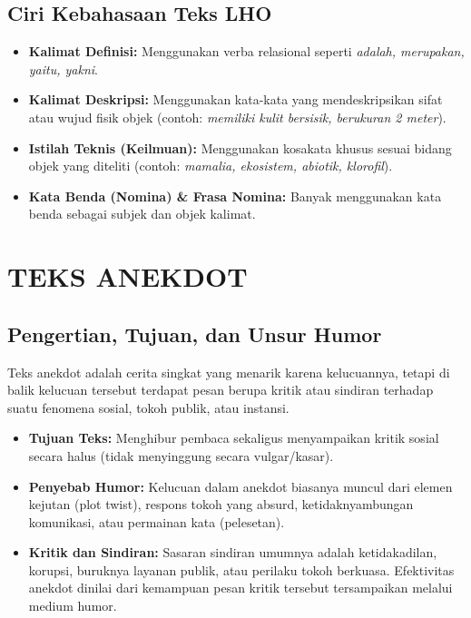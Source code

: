 \documentclass[12pt, a4paper]{article}
\begin{document}
\subsection{Ciri Kebahasaan Teks LHO}
\begin{itemize}
    \item \textbf{Kalimat Definisi:} Menggunakan verba relasional seperti \textit{adalah, merupakan, yaitu, yakni}.
    \item \textbf{Kalimat Deskripsi:} Menggunakan kata-kata yang mendeskripsikan sifat atau wujud fisik objek (contoh: \textit{memiliki kulit bersisik, berukuran 2 meter}).
    \item \textbf{Istilah Teknis (Keilmuan):} Menggunakan kosakata khusus sesuai bidang objek yang diteliti (contoh: \textit{mamalia, ekosistem, abiotik, klorofil}).
    \item \textbf{Kata Benda (Nomina) \& Frasa Nomina:} Banyak menggunakan kata benda sebagai subjek dan objek kalimat.
\end{itemize}

\section{TEKS ANEKDOT}

\subsection{Pengertian, Tujuan, dan Unsur Humor}
Teks anekdot adalah cerita singkat yang menarik karena kelucuannya, tetapi di balik kelucuan tersebut terdapat pesan berupa kritik atau sindiran terhadap suatu fenomena sosial, tokoh publik, atau instansi.
\begin{itemize}
    \item \textbf{Tujuan Teks:} Menghibur pembaca sekaligus menyampaikan kritik sosial secara halus (tidak menyinggung secara vulgar/kasar).
    \item \textbf{Penyebab Humor:} Kelucuan dalam anekdot biasanya muncul dari elemen kejutan (plot twist), respons tokoh yang absurd, ketidaknyambungan komunikasi, atau permainan kata (pelesetan).
    \item \textbf{Kritik dan Sindiran:} Sasaran sindiran umumnya adalah ketidakadilan, korupsi, buruknya layanan publik, atau perilaku tokoh berkuasa. Efektivitas anekdot dinilai dari kemampuan pesan kritik tersebut tersampaikan melalui medium humor.
\end{itemize}
\end{document}
